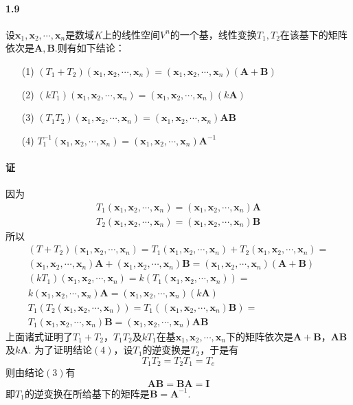 \documentclass[12pt, a4paper, oneside, fontset=none]{ctexart}
\begin{document}
\paragraph*{1.9} 设$\bm{x}_1,\bm{x}_2,\cdots,\bm{x}_n$是数域$K$上的线性空间$V^n$的一个基，线性变换$T_1, T_2$在该基下的矩阵
依次是$\bm{A}, \bm{B}$.则有如下结论：
\begin{enumerate}
    \item[(1)] $(T_1 + T_2)(\bm{x}_1,\bm{x}_2,\cdots,\bm{x}_n) = (\bm{x}_1,\bm{x}_2,\cdots,\bm{x}_n)(\bm{A} + \bm{B})$
    \item[(2)] $(kT_1)(\bm{x}_1,\bm{x}_2,\cdots,\bm{x}_n) = (\bm{x}_1,\bm{x}_2,\cdots,\bm{x}_n)(k\bm{A})$
    \item[(3)] $(T_1T_2)(\bm{x}_1,\bm{x}_2,\cdots,\bm{x}_n) = (\bm{x}_1,\bm{x}_2,\cdots,\bm{x}_n)\bm{AB}$
    \item[(4)] $T_1^{-1}(\bm{x}_1,\bm{x}_2,\cdots,\bm{x}_n) = (\bm{x}_1,\bm{x}_2,\cdots,\bm{x}_n) \bm{A}^{-1}$
\end{enumerate}

\paragraph*{证} 因为
\begin{gather*}
    T_1 (\bm{x}_1,\bm{x}_2,\cdots,\bm{x}_n) = (\bm{x}_1,\bm{x}_2,\cdots,\bm{x}_n) \bm{A} \\
    T_2 (\bm{x}_1,\bm{x}_2,\cdots,\bm{x}_n) = (\bm{x}_1,\bm{x}_2,\cdots,\bm{x}_n) \bm{B}
\end{gather*}
所以
\begin{gather*}
    (T + T_2)(\bm{x}_1,\bm{x}_2,\cdots,\bm{x}_n) = T_1(\bm{x}_1,\bm{x}_2,\cdots,\bm{x}_n) + T_2 (\bm{x}_1,\bm{x}_2,\cdots,\bm{x}_n) = \\
    (\bm{x}_1,\bm{x}_2,\cdots,\bm{x}_n) \bm{A} + (\bm{x}_1,\bm{x}_2,\cdots,\bm{x}_n) \bm{B} = (\bm{x}_1,\bm{x}_2,\cdots,\bm{x}_n) (\bm{A} + \bm{B}) \\
    (kT_1)(\bm{x}_1,\bm{x}_2,\cdots,\bm{x}_n) = k(T_1(\bm{x}_1,\bm{x}_2,\cdots,\bm{x}_n)) =  \\
    k(\bm{x}_1,\bm{x}_2,\cdots,\bm{x}_n) \bm{A} = (\bm{x}_1,\bm{x}_2,\cdots,\bm{x}_n) (k\bm{A}) \\
    T_1(T_2(\bm{x}_1,\bm{x}_2,\cdots,\bm{x}_n)) = T_1((\bm{x}_1,\bm{x}_2,\cdots,\bm{x}_n)\bm{B}) =\\
    T_1(\bm{x}_1,\bm{x}_2,\cdots,\bm{x}_n)\bm{B} = (\bm{x}_1,\bm{x}_2,\cdots,\bm{x}_n)\bm{AB}
\end{gather*}
上面诸式证明了$T_1 + T_2$，$T_1T_2$及$kT_1$在基$\bm{x}_1,\bm{x}_2,\cdots,\bm{x}_n$下的矩阵依次是$\bm{A} + \bm{B}$，$\bm{AB}$及$k\bm{A}$.
为了证明结论$(4)$，设$T_1$的逆变换是$T_2$，于是有
\[
    T_1T_2 = T_2T_1 = T_e
\]
则由结论$(3)$有
\[
    \bm{AB} = \bm{BA} = \bm{I}
\]
即$T_1$的逆变换在所给基下的矩阵是$\bm{B} = \bm{A}^{-1}$.
\end{document}
